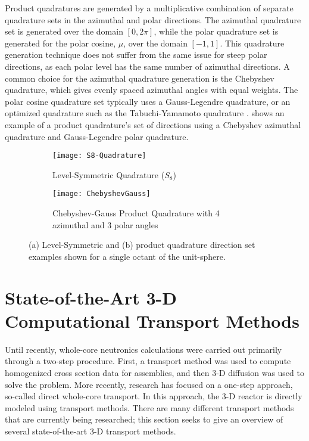 {{{{{          Product quadratures are generated by a multiplicative combination of separate quadrature sets in the azimuthal and polar directions.
          The azimuthal quadrature set is generated over the domain $[0,2\pi]$, while the polar quadrature set is generated for the polar cosine, $\mu$, over the domain $[-1,1]$.
          This quadrature generation technique does not suffer from the same issue for steep polar directions, as each polar level has the same number of azimuthal directions.
          A common choice for the azimuthal quadrature generation is the Chebyshev quadrature, which gives evenly spaced azimuthal angles with equal weights.
          The polar cosine quadrature set typically uses a Gauss-Legendre quadrature, or an optimized quadrature such as the Tabuchi-Yamamoto quadrature \cite{TabuchiYamamotoQuad}.
           shows an example of a product quadrature's set of directions using a Chebyshev azimuthal quadrature and Gauss-Legendre polar quadrature.

          \begin{figure}[h]
            \centering
            \begin{subfigure}[t]{0.45\linewidth}
              \centering
              \texttt{[image: S8-Quadrature]}
              \caption{Level-Symmetric Quadrature ($S_8$)}
              \label{fig:NTT:S8 Quadrature}
            \end{subfigure}%
            \hfill
            \begin{subfigure}[t]{0.45\linewidth}
              \centering
              \texttt{[image: ChebyshevGauss]}
              \caption{Chebyshev-Gauss Product Quadrature with 4 azimuthal and 3 polar angles}
              \label{fig:NTT:ChebyshevGauss Quadrature}
            \end{subfigure}
            \caption{(a) Level-Symmetric and (b) product quadrature direction set examples shown for a single octant of the unit-sphere.}
            \label{fig:NTT:Quadrature Examples}
          \end{figure}
        }
      }
    }
  }

  \section{State-of-the-Art 3-D Computational Transport Methods}{\label{sec:NTT:3-D Transport Methods}
    Until recently, whole-core neutronics calculations were carried out primarily through a two-step procedure.
    First, a transport method was used to compute homogenized cross section data for assemblies, and then 3-D diffusion was used to solve the problem.
    More recently, research has focused on a one-step approach, so-called direct whole-core transport.
    In this approach, the 3-D reactor is directly modeled using transport methods.
    There are many different transport methods that are currently being researched; this section seeks to give an overview of several state-of-the-art 3-D transport methods.

}}
